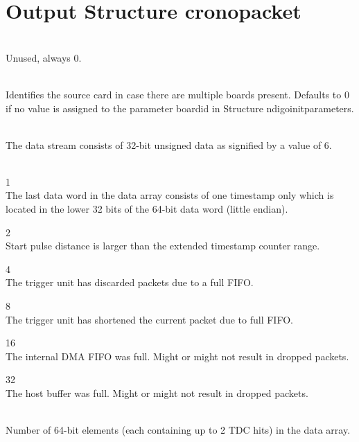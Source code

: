


\section{Output Structure crono\tu packet}

	\\
	Unused, always 0.\par

	\\
	Identifies the source card in case there are multiple boards present. 
	Defaults to 0 if no value is assigned to the parameter \textsf{board\tu id} in Structure \textsf{ndigo\tu init\tu parameters}.\par

	\\
	The data stream consists of 32-bit unsigned data as signified by a value of 6.\par

	\\
	\indent{} 1\\
	\indent The last data word in the data array consists of one timestamp only which is located in the lower 32 bits of the 64-bit data word (little endian).\par
	\indent{} 2\\
	\indent Start pulse distance is larger than the extended timestamp counter range.\par
	\indent{} 4\\
	\indent The trigger unit has discarded packets due to a full FIFO.\par
	\indent{} 8\\
	\indent The trigger unit has shortened the current packet due to full FIFO.\par
	\indent{} 16\\
	\indent The internal DMA FIFO was full. Might or might not result in dropped packets.\par
	\indent{} 32\\
	\indent The host buffer was full. Might or might not result in dropped packets.\par

	\\
	Number of 64-bit elements (each containing up to 2 TDC hits) in the data array.\par

